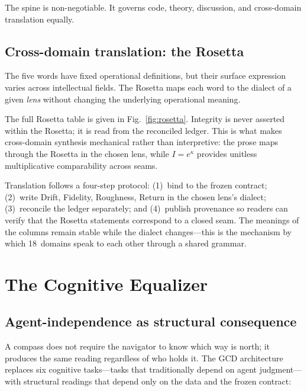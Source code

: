 \documentclass[
  aps,
  prd,
  twocolumn,
  superscriptaddress,
  nofootinbib,
  floatfix
]{revtex4-2}
\begin{document}
The spine is non-negotiable.  It governs code, theory, discussion,
and cross-domain translation equally.

\subsection{Cross-domain translation: the Rosetta}

The five words have fixed operational definitions, but their
surface expression varies across intellectual fields.  The Rosetta
maps each word to the dialect of a given \emph{lens} without
changing the underlying operational meaning.

The full Rosetta table is given in Fig.~\ref{fig:rosetta}.
Integrity is never asserted within the Rosetta; it is
read from the reconciled ledger.  This is what makes cross-domain
synthesis mechanical rather than interpretive: the prose maps
through the Rosetta in the chosen lens, while $I = e^\kappa$
provides unitless multiplicative comparability across seams.

Translation follows a four-step protocol: (1)~bind to the frozen
contract; (2)~write Drift, Fidelity, Roughness, Return in the
chosen lens's dialect; (3)~reconcile the ledger separately; and
(4)~publish provenance so readers can verify that the Rosetta
statements correspond to a closed seam.  The meanings of the
columns remain stable while the dialect changes---this is the
mechanism by which 18~domains speak to each other through a
shared grammar.


\section{The Cognitive Equalizer}\label{sec:equalizer}

\subsection{Agent-independence as structural consequence}

A compass does not require the navigator to know which way is
north; it produces the same reading regardless of who holds it.
The GCD architecture replaces six cognitive tasks---tasks that
traditionally depend on agent judgment---with structural readings
that depend only on the data and the frozen contract:
\end{document}
